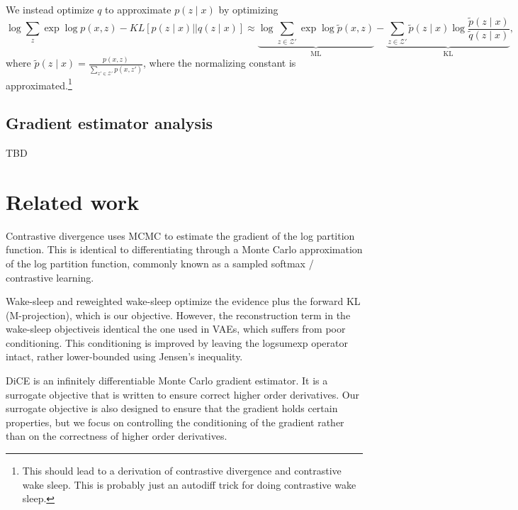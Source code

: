 \documentclass[12pt]{article}
\begin{document}
We instead optimize $q$ to approximate $p(z\mid x)$ by optimizing
\begin{equation}
\log\sum_z\exp \log p(x,z) - KL[p(z\mid x) || q(z \mid x)]
\approx 
\underbrace{\log\sum_{z\in\mathcal{Z}'}\exp \log \tilde{p}(x,z)}_{\text{ML}}
-
\underbrace{
\sum_{z\in\mathcal{Z}'}\tilde{p}(z\mid x) \log \frac{\tilde{p}(z\mid x)}{\tilde{q}(z \mid x)}
}_{\text{KL}},
\end{equation}
where $\tilde{p}(z\mid x) = \frac{p(x,z)}{\sum_{z' \in \mathcal{Z}'}p(x,z')}$,
where the normalizing constant is approximated.\footnote{
    This should lead to a derivation of contrastive divergence and contrastive wake sleep.
    This is probably just an autodiff trick for doing contrastive wake sleep.
}

\subsection{Gradient estimator analysis}
TBD

\section{Related work}
Contrastive divergence uses MCMC to estimate the gradient of the log partition function.
This is identical to differentiating through a Monte Carlo approximation of the
log partition function, commonly known as a sampled softmax / contrastive learning.

Wake-sleep and reweighted wake-sleep optimize the evidence plus the forward KL (M-projection),
which is our objective.
However, the reconstruction term in the wake-sleep objectiveis identical the one used in
VAEs, which suffers from poor conditioning.
This conditioning is improved by leaving the logsumexp operator intact,
rather lower-bounded using Jensen's inequality.

DiCE is an infinitely differentiable Monte Carlo gradient estimator.
It is a surrogate objective that is written to ensure correct higher order derivatives.
Our surrogate objective is also designed to ensure that the gradient holds certain properties,
but we focus on controlling the conditioning of the gradient rather than on the correctness
of higher order derivatives.
\end{document}
